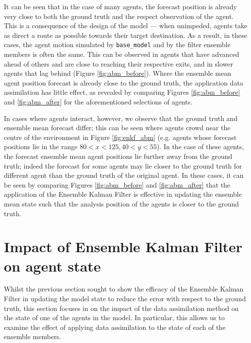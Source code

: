 It can be seen that in the case of many agents, the forecast position is already
very close to both the ground truth and the respect observation of the agent.
This is a consequence of the design of the model --- when unimpeded, agents take
as direct a route as possible towards their target destination.
As a result, in these cases, the agent motion simulated by \texttt{base\_model}
and by the filter ensemble members is often the same.
This can be observed in agents that have advanced ahead of others and are close
to reaching their respective exits, and in slower agents that lag behind (Figure
\ref{fig:abm_before}).
Where the ensemble mean agent position forecast is already close to the ground
truth, the application data assimilation has little effect, as revealed by
comparing Figures \ref{fig:abm_before} and \ref{fig:abm_after} for the
aforementioned selections of agents.

In cases where agents interact, however, we observe that the ground truth and
ensemble mean forecast differ; this can be seen where agents crowd near the
centre of the environment in Figure \ref{fig:enkf_abm} (e.g. agents whose
forecast positions lie in the range $80<x<125, 40<y<55$).
In the case of these agents, the forecast ensemble mean agent positions lie
further away from the ground truth; indeed the forecast for some agents may lie
closer to the ground truth for different agent than the ground truth of the
original agent. 
In these cases, it can be seen by comparing Figures \ref{fig:abm_before} and
\ref{fig:abm_after} that the application of the Ensemble Kalman Filter is
effective in updating the ensemble mean state such that the analysis position of
the agents is closer to the ground truth.

\section{Impact of Ensemble Kalman Filter on agent
state}\label{sec:results:agent}

Whilst the previous section sought to show the efficacy of the Ensemble Kalman
Filter in updating the model state to reduce the error with respect to the
ground truth, this section focuses in on the impact of the data assimilation
method on the state of one of the agents in the model.
In particular, this allows us to examine the effect of applying data
assimilation to the state of each of the ensemble members.

